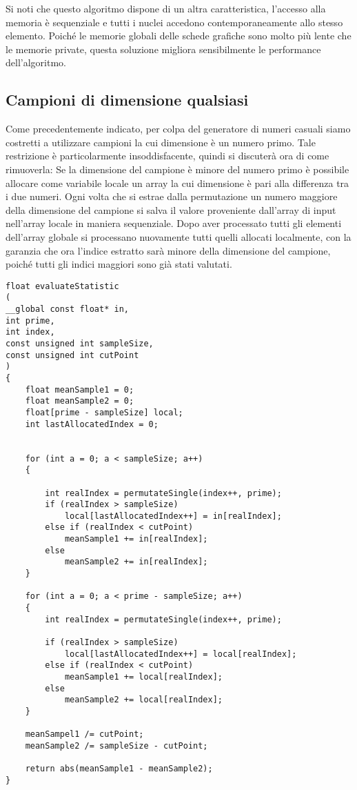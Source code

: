 Si noti che questo algoritmo dispone di un altra caratteristica, l'accesso alla memoria è sequenziale e tutti i nuclei accedono contemporaneamente allo stesso elemento. Poiché le memorie globali delle schede grafiche sono molto più lente che le memorie private, questa soluzione migliora sensibilmente le performance dell'algoritmo.

\subsection{Campioni di dimensione qualsiasi}
Come precedentemente indicato, per colpa del generatore di numeri casuali siamo costretti a utilizzare campioni la cui dimensione è un numero primo. Tale restrizione è particolarmente insoddisfacente, quindi si discuterà ora di come rimuoverla:
Se la dimensione del campione è minore del numero primo è possibile allocare come variabile locale un array la cui dimensione è pari alla differenza tra i due numeri. Ogni volta che si estrae dalla permutazione un numero maggiore della dimensione del campione si salva il valore proveniente dall'array di input nell'array locale in maniera sequenziale. Dopo aver processato tutti gli elementi dell'array globale si processano nuovamente tutti quelli allocati localmente, con la garanzia che ora l'indice estratto sarà minore della dimensione del campione, poiché tutti gli indici maggiori sono già stati valutati.


\begin{lstlisting}[style=CStyle]
float evaluateStatistic
(
__global const float* in,
int prime,
int index,
const unsigned int sampleSize, 
const unsigned int cutPoint
)
{
	float meanSample1 = 0;
	float meanSample2 = 0;
	float[prime - sampleSize] local;
	int lastAllocatedIndex = 0;
	
	
	for (int a = 0; a < sampleSize; a++)
	{
	
		int realIndex = permutateSingle(index++, prime);
		if (realIndex > sampleSize)
			local[lastAllocatedIndex++] = in[realIndex];
		else if (realIndex < cutPoint)
			meanSample1 += in[realIndex];
		else
			meanSample2 += in[realIndex];
	}
	
	for (int a = 0; a < prime - sampleSize; a++)
	{
		int realIndex = permutateSingle(index++, prime);
		
		if (realIndex > sampleSize)
			local[lastAllocatedIndex++] = local[realIndex];
		else if (realIndex < cutPoint)
			meanSample1 += local[realIndex];	
		else
			meanSample2 += local[realIndex];
	}
	
	meanSampel1 /= cutPoint;
	meanSample2 /= sampleSize - cutPoint;	
	
	return abs(meanSample1 - meanSample2);
}
\end{lstlisting}
